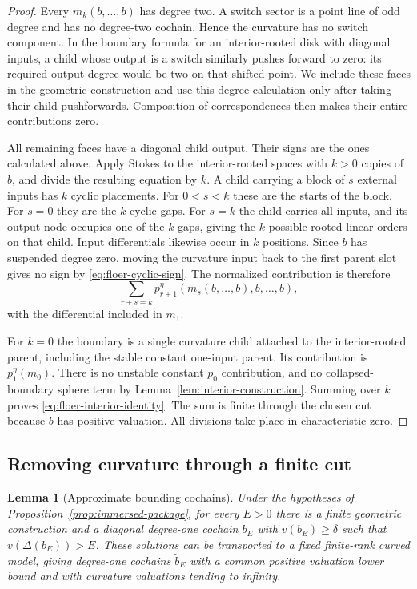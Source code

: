 \documentclass[11pt]{article}
\numberwithin{equation}{section}
\newtheorem{lemma}[theorem]{Lemma}
\theoremstyle{definition}
\theoremstyle{remark}
\begin{document}
\begin{proof}
Every $m_k(b,\ldots,b)$ has degree two.  A switch sector is a point
line of odd degree and has no degree-two cochain.  Hence the curvature
has no switch component.  In the boundary formula for an
interior-rooted disk with diagonal inputs, a child whose output is a
switch similarly pushes forward to zero: its required output degree
would be two on that shifted point.  We include these faces in the
geometric construction and use this degree calculation only after
taking their child pushforwards.  Composition of correspondences then
makes their entire contributions zero.

All remaining faces have a diagonal child output.  Their signs are the
ones calculated above.  Apply Stokes to the interior-rooted spaces
with $k>0$ copies of $b$, and divide the resulting equation by $k$.
A child carrying a block of $s$ external inputs has $k$ cyclic
placements.  For $0<s<k$ these are the starts of the block.  For $s=0$
they are the $k$ cyclic gaps.  For $s=k$ the child carries all inputs,
and its output node occupies one of the $k$ gaps, giving the $k$
possible rooted linear orders on that child.  Input differentials
likewise occur in $k$ positions.  Since $b$ has suspended degree zero,
moving the curvature input back to the first parent slot gives no
sign by \eqref{eq:floer-cyclic-sign}.  The normalized contribution is
therefore
\[
 \sum_{r+s=k}p^\eta_{r+1}(m_s(b,\ldots,b),b,\ldots,b),
\]
with the differential included in $m_1$.

For $k=0$ the boundary is a single curvature child attached to the
interior-rooted parent, including the stable constant one-input
parent.  Its contribution is $p^\eta_1(m_0)$.  There is no unstable
constant $p_0$ contribution, and no collapsed-boundary sphere term by
Lemma~\ref{lem:interior-construction}.  Summing over $k$ proves
\eqref{eq:floer-interior-identity}.  The sum is finite through the
chosen cut because $b$ has positive valuation.  All divisions take
place in characteristic zero.
\end{proof}

\subsection{Removing curvature through a finite cut}

\begin{lemma}[Approximate bounding cochains]
 \label{lem:approximate-bounding}
Under the hypotheses of Proposition~\ref{prop:immersed-package}, for
every $E>0$ there is a finite geometric construction and a diagonal
degree-one cochain $b_E$ with $v(b_E)\geq\delta$ such that
$v(\Delta(b_E))>E$.  These solutions can be transported to a fixed
finite-rank curved model, giving degree-one cochains $\widetilde b_E$
with a common positive valuation lower bound and with curvature
valuations tending to infinity.
\end{lemma}
\end{document}
